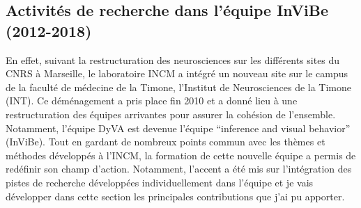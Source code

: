 \subsection{Activités de recherche dans l'équipe InViBe (2012-2018)}
\label{sec:invibe}%



En effet, suivant la restructuration des neurosciences sur les différents sites du CNRS à Marseille, le laboratoire INCM a intégré un nouveau site sur le campus de la faculté de médecine de la Timone, l'Institut de Neurosciences de la Timone (INT). Ce déménagement a pris place fin 2010 et a donné lieu à une restructuration des équipes arrivantes pour assurer la cohésion de l'ensemble. Notamment, l'équipe DyVA est devenue l'équipe ``inference and visual behavior'' ({\sc InViBe}). Tout en gardant de nombreux points commun avec les thèmes et méthodes développés à l'INCM, la formation de cette nouvelle équipe a permis de redéfinir son champ d'action. Notamment, l'accent a été mis sur l'intégration des pistes de recherche développées individuellement dans l'équipe et je vais développer dans cette section les principales contributions que j'ai pu apporter. %

